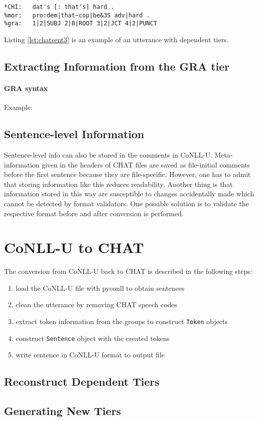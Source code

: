 \lstset{
numbers = none,
frame = single,
}

\begin{lstlisting}[caption={Excerpt from Adam/040217.cha of the Brown Corpus (\cite{brown1973})}, label={lst:chatsent3}]
*CHI:   dat's [: that's] hard .
%mor:   pro:dem|that~cop|be&3S adv|hard .
%gra:   1|2|SUBJ 2|0|ROOT 3|2|JCT 4|2|PUNCT
\end{lstlisting}

Listing \ref{lst:chatsent3} is an example of an utterance with dependent tiers.\\

\subsection{Extracting Information from the GRA tier}

\paragraph{GRA syntax}
Example:


\subsection{Sentence-level Information}
Sentence-level info can also be stored in the comments in CoNLL-U. Meta-information given in the headers of CHAT files are saved as file-initial comments before the first sentence because they are file-specific.
However, one has to admit that storing information like this reduces readability. Another thing is that information stored in this way are susceptible to changes accidentally made which cannot be detected by format validators. One possible solution is to validate the respective format before and after conversion is performed.


\section{CoNLL-U to CHAT}

The conversion from CoNLL-U back to CHAT is described in the following steps:
\begin{enumerate}
	\item load the CoNLL-U file with pyconll to obtain sentences
	\item clean the utterance by removing CHAT speech codes
	\item extract token information from the groups to construct \texttt{Token} objects
	\item construct \texttt{Sentence} object with the created tokens
	\item write sentence in CoNLL-U format to output file
\end{enumerate}

\subsection{Reconstruct Dependent Tiers}

\subsection{Generating New Tiers}
